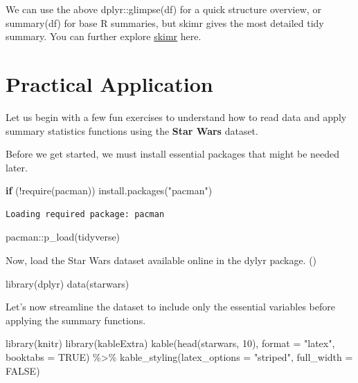 \documentclass[
  man,
  floatsintext,
  longtable,
  nolmodern,
  notxfonts,
  notimes,
  colorlinks=true,linkcolor=blue,citecolor=blue,urlcolor=blue]{apa7}
\newenvironment{Shaded}{\begin{snugshade}}{\end{snugshade}}
\newcommand{\AttributeTok}[1]{\textcolor[rgb]{0.40,0.45,0.13}{#1}}
\newcommand{\ConstantTok}[1]{\textcolor[rgb]{0.56,0.35,0.01}{#1}}
\newcommand{\ControlFlowTok}[1]{\textcolor[rgb]{0.00,0.23,0.31}{\textbf{#1}}}
\newcommand{\DecValTok}[1]{\textcolor[rgb]{0.68,0.00,0.00}{#1}}
\newcommand{\FunctionTok}[1]{\textcolor[rgb]{0.28,0.35,0.67}{#1}}
\newcommand{\NormalTok}[1]{\textcolor[rgb]{0.00,0.23,0.31}{#1}}
\newcommand{\SpecialCharTok}[1]{\textcolor[rgb]{0.37,0.37,0.37}{#1}}
\newcommand{\StringTok}[1]{\textcolor[rgb]{0.13,0.47,0.30}{#1}}
\begin{document}
We can use the above dplyr::glimpse(df) for a quick structure overview,
or summary(df) for base R summaries, but skimr gives the most detailed
tidy summary. You can further explore
\href{https://docs.ropensci.org/skimr/}{skimr} here.

\newpage

\section{Practical Application}\label{practical-application}

Let us begin with a few fun exercises to understand how to read data and
apply summary statistics functions using the \textbf{Star Wars} dataset.

Before we get started, we must install essential packages that might be
needed later.

\begin{Shaded}
\begin{Highlighting}[]
\ControlFlowTok{if}\NormalTok{ (}\SpecialCharTok{!}\FunctionTok{require}\NormalTok{(pacman)) }\FunctionTok{install.packages}\NormalTok{(}\StringTok{"pacman"}\NormalTok{)}
\end{Highlighting}
\end{Shaded}

\begin{verbatim}
Loading required package: pacman
\end{verbatim}

\begin{Shaded}
\begin{Highlighting}[]
\NormalTok{pacman}\SpecialCharTok{::}\FunctionTok{p\_load}\NormalTok{(tidyverse)}
\end{Highlighting}
\end{Shaded}

Now, load the Star Wars dataset available online in the dylyr package.
()

\begin{Shaded}
\begin{Highlighting}[]
\FunctionTok{library}\NormalTok{(dplyr)}
\FunctionTok{data}\NormalTok{(starwars)}
\end{Highlighting}
\end{Shaded}

Let's now streamline the dataset to include only the essential variables
before applying the summary functions.

\begin{Shaded}
\begin{Highlighting}[]
\FunctionTok{library}\NormalTok{(knitr)}
\FunctionTok{library}\NormalTok{(kableExtra)}
\FunctionTok{kable}\NormalTok{(}\FunctionTok{head}\NormalTok{(starwars, }\DecValTok{10}\NormalTok{), }\AttributeTok{format =} \StringTok{"latex"}\NormalTok{, }\AttributeTok{booktabs =} \ConstantTok{TRUE}\NormalTok{) }\SpecialCharTok{\%\textgreater{}\%}
  \FunctionTok{kable\_styling}\NormalTok{(}\AttributeTok{latex\_options =} \StringTok{"striped"}\NormalTok{, }\AttributeTok{full\_width =} \ConstantTok{FALSE}\NormalTok{)}
\end{Highlighting}
\end{Shaded}
\end{document}
